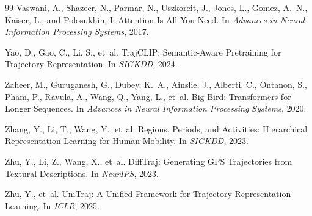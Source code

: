 \documentclass{article}
\begin{document}
\begin{thebibliography}{99}
Vaswani, A., Shazeer, N., Parmar, N., Uszkoreit, J., Jones, L., Gomez, A.~N., Kaiser, L., and Polosukhin, I.
\newblock Attention Is All You Need.
\newblock In \emph{Advances in Neural Information Processing Systems}, 2017.

Yao, D., Gao, C., Li, S., et~al.
\newblock TrajCLIP: Semantic-Aware Pretraining for Trajectory Representation.
\newblock In \emph{SIGKDD}, 2024.

Zaheer, M., Guruganesh, G., Dubey, K.~A., Ainslie, J., Alberti, C., Ontanon, S., Pham, P., Ravula, A., Wang, Q., Yang, L., et~al.
\newblock Big Bird: Transformers for Longer Sequences.
\newblock In \emph{Advances in Neural Information Processing Systems}, 2020.

Zhang, Y., Li, T., Wang, Y., et~al.
\newblock Regions, Periods, and Activities: Hierarchical Representation Learning for Human Mobility.
\newblock In \emph{SIGKDD}, 2023.

Zhu, Y., Li, Z., Wang, X., et~al.
\newblock DiffTraj: Generating GPS Trajectories from Textural Descriptions.
\newblock In \emph{NeurIPS}, 2023.

Zhu, Y., et~al.
\newblock UniTraj: A Unified Framework for Trajectory Representation Learning.
\newblock In \emph{ICLR}, 2025.

\end{thebibliography}
\end{document}
